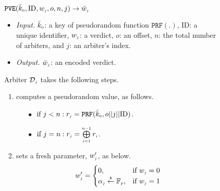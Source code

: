  \vspace{-1.7mm}
\begin{figure}[!htbp]
\setlength{\fboxsep}{1pt}
\begin{center}
    \begin{tcolorbox}[enhanced,width=5.5in, height=57mm,
    drop fuzzy shadow southwest,
    colframe=black,colback=white]
    \small{
    \vspace{-2.1mm}
\underline{$\mathtt{PVE}(\bar{k}_{\scriptscriptstyle 0}, \text{ID},  w_{\scriptscriptstyle j}, o, n,  j)\rightarrow  \bar{  w}_{\scriptscriptstyle j}$}\\
%
    \vspace{-2.1mm}
\begin{itemize}
\item \noindent\textit{Input.} $\bar{k}_{\scriptscriptstyle 0}$: a key of  pseudorandom function $\mathtt{PRF}(.)$, $\text{ID}$: a unique identifier, $ w_{\scriptscriptstyle j}$: a  verdict, $o$: an offset, $n$: the total number of  arbiters,  and  $j$: an arbiter's index.
%
\item \noindent\textit{Output.} $\bar{  w}_{\scriptscriptstyle j}$:  an  encoded verdict.  
%
\end{itemize}
Arbiter $\mathcal{D}_{\scriptscriptstyle j}$ takes the following steps.
    \vspace{-1.2mm}
\begin{enumerate}
%
\item\label{ZSPA:val-gen} computes a  pseudorandom  value,  as follows. 
%
\begin{itemize}
%
\item[$\bullet$]$ \text{ if } j< n: r_{\scriptscriptstyle j}=\mathtt{PRF}(\bar k_{\scriptscriptstyle 0}, o||j||\text{ID})$.\\
%
    \vspace{-1.6mm}
\item [$\bullet$] $ \text{ if } j=n: r_{\scriptscriptstyle j}= \bigoplus\limits^{\scriptscriptstyle n-1}_{\scriptscriptstyle i=1} r_{\scriptscriptstyle i}$.
%
\end{itemize}
%
\item  sets a fresh parameter, $w'_{\scriptscriptstyle j}$, as below. 
%
    \vspace{-1.5mm}
\begin{equation*}
   w'_{\scriptscriptstyle j}= 
\begin{cases}
   0,              & \text{if } w_{\scriptscriptstyle j}=0\\
   \alpha_{\scriptscriptstyle j}\stackrel{\scriptscriptstyle\$}\leftarrow \mathbb{F}_{\scriptscriptstyle p} ,& \text{if } w_{\scriptscriptstyle j}=1\\

\end{cases}
\end{equation*}
%


\end{enumerate}}
\end{tcolorbox}
\end{center}
\end{figure}
